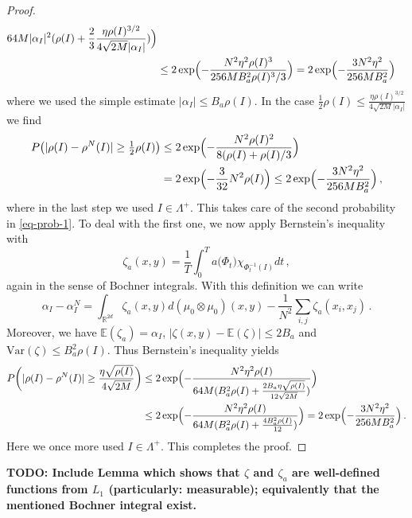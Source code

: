 \documentclass[A4paper,11pt]{article}
\theoremstyle{definition}
\newcommand{\R}{\mathbb{R}}
\begin{document}
\begin{proof}
\begin{align*}
				{64M|\alpha_I|^2(\rho(I)+\frac{2}{3}\frac{\eta\rho(I)^{3/2}}{4\sqrt{2M}|\alpha_I|})}\Bigr)\\
			&\leq 2\exp\Bigl(-\frac{N^2\eta^2\rho(I)^3}{256M B_a^2\rho(I)^3/3}\Bigr)
				=2\exp\Bigl(-\frac{3N^2\eta^2}{256M B_a^2}\Bigr)
	\end{align*}
	where we used the simple estimate $|\alpha_I|\leq B_a\rho(I)$. In the case
	$\frac{1}{2}\rho(I)\leq\frac{\eta\rho(I)^{3/2}}{4\sqrt{2M}|\alpha_I|}$ we find
	\begin{align*}
		P\bigl(|\rho(I)-\rho^N(I)|\geq\tfrac{1}{2}\rho(I)\bigr)
			&\leq 2\exp\Bigl(-\frac{N^2\rho(I)^2}{8(\rho(I)+\rho(I)/3}\Bigr)\\
			&=2\exp\Bigl(-\frac{3}{32}N^2\rho(I)\Bigr)
				\leq 2\exp\Bigl(-\frac{3N^2\eta^2}{256MB_a^2}\Bigr)\,,
	\end{align*}
	where in the last step we used $I\in\Lambda^+$. This takes care of the second probability in \eqref{eq-prob-1}. To
	deal with the first one, we now apply Bernstein's inequality with
	\[
		\zeta_a(x,y)
			=\frac{1}{T}\int_0^T a\bigl(\Phi_t\bigr)\chi_{\Phi_t^{-1}(I)} dt\,,
	\]
	again in the sense of Bochner integrals. With this definition we can write
	\[
		\alpha_I-\alpha^N_I
			=\int_{\R^{2d}}\zeta_a(x,y)d(\mu_0\otimes\mu_0)(x,y)
				-\frac{1}{N^2}\sum_{i,j}\zeta_a(x_i,x_j)\,.
	\]
	Moreover, we have $\mathbb{E}(\zeta_a)=\alpha_I$, $|\zeta(x,y)-\mathbb{E}(\zeta)|\leq 2B_a$ and
	$\text{Var}(\zeta)\leq B_a^2\rho(I)$. Thus Bernstein's inequality yields
	\begin{align*}
		P\biggl(|\rho(I)-\rho^N(I)|\geq\frac{\eta\sqrt{\rho(I)}}{4\sqrt{2M}}\biggr)
			&\leq 2\exp\Bigl(-\frac{N^2\eta^2\rho(I)}
				{64M(B_a^2\rho(I)+\frac{2B_a\eta\sqrt{\rho(I)}}{12\sqrt{2M}})}\Bigr)\\
			&\leq 2\exp\Bigl(-\frac{N^2\eta^2\rho(I)}{64M(B_a^2\rho(I)+\frac{4B_a^2\rho(I)}{12})}\Bigr)
					=2\exp\Bigl(-\frac{3N^2\eta^2}{256MB_a^2}\Bigr)\,.
	\end{align*}
	Here we once more used $I\in\Lambda^+$. This completes the proof.
\end{proof}

{\bf TODO: Include Lemma which shows that $\zeta$ and $\zeta_a$ are well-defined functions from $L_1$ (particularly: measurable); equivalently that the mentioned Bochner integral exist.}
\end{document}
